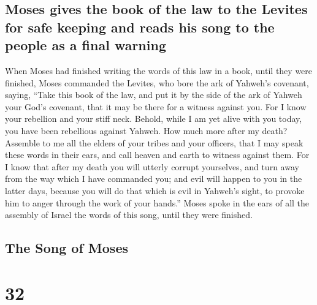 \hypertarget{moses-gives-the-book-of-the-law-to-the-levites-for-safe-keeping-and-reads-his-song-to-the-people-as-a-final-warning}{%
\subsection{Moses gives the book of the law to the Levites for safe
keeping and reads his song to the people as a final
warning}\label{moses-gives-the-book-of-the-law-to-the-levites-for-safe-keeping-and-reads-his-song-to-the-people-as-a-final-warning}}

 When Moses had finished writing the words of this law in
a book, until they were finished,  Moses commanded the
Levites, who bore the ark of Yahweh's covenant, saying, 
``Take this book of the law, and put it by the side of the ark of Yahweh
your God's covenant, that it may be there for a witness against you.
 For I know your rebellion and your stiff neck. Behold,
while I am yet alive with you today, you have been rebellious against
Yahweh. How much more after my death?  Assemble to me all
the elders of your tribes and your officers, that I may speak these
words in their ears, and call heaven and earth to witness against them.
 For I know that after my death you will utterly corrupt
yourselves, and turn away from the way which I have commanded you; and
evil will happen to you in the latter days, because you will do that
which is evil in Yahweh's sight, to provoke him to anger through the
work of your hands.''  Moses spoke in the ears of all the
assembly of Israel the words of this song, until they were finished.

\hypertarget{the-song-of-moses}{%
\subsection{The Song of Moses}\label{the-song-of-moses}}

\hypertarget{section-31}{%
\section{32}\label{section-31}}

